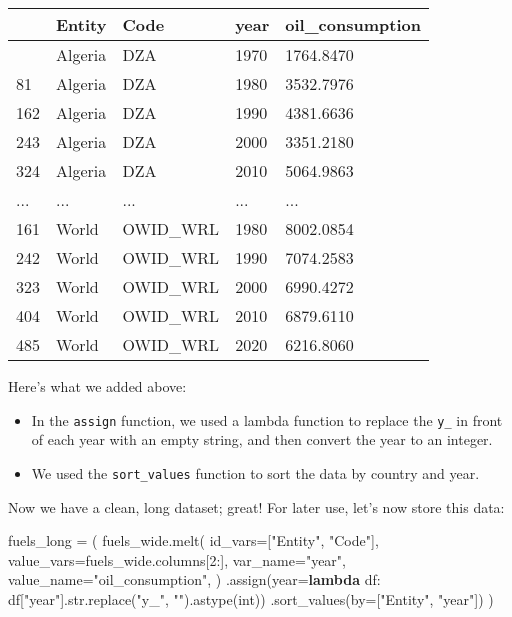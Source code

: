 \documentclass[
  letterpaper,
  DIV=11,
  numbers=noendperiod]{scrreprt}
\newenvironment{Shaded}{\begin{snugshade}}{\end{snugshade}}
\newcommand{\BuiltInTok}[1]{\textcolor[rgb]{0.00,0.23,0.31}{#1}}
\newcommand{\DecValTok}[1]{\textcolor[rgb]{0.68,0.00,0.00}{#1}}
\newcommand{\KeywordTok}[1]{\textcolor[rgb]{0.00,0.23,0.31}{\textbf{#1}}}
\newcommand{\NormalTok}[1]{\textcolor[rgb]{0.00,0.23,0.31}{#1}}
\newcommand{\OperatorTok}[1]{\textcolor[rgb]{0.37,0.37,0.37}{#1}}
\newcommand{\StringTok}[1]{\textcolor[rgb]{0.13,0.47,0.30}{#1}}
\providecommand{\tightlist}{%
  \setlength{\itemsep}{0pt}\setlength{\parskip}{0pt}}\usepackage{longtable,booktabs,array}
\begin{document}
\begin{longtable}[]{@{}lllll@{}}
\toprule\noalign{}
& Entity & Code & year & oil\_consumption \\
\midrule\noalign{}
\endhead
\bottomrule\noalign{}
\endlastfoot
0 & Algeria & DZA & 1970 & 1764.8470 \\
81 & Algeria & DZA & 1980 & 3532.7976 \\
162 & Algeria & DZA & 1990 & 4381.6636 \\
243 & Algeria & DZA & 2000 & 3351.2180 \\
324 & Algeria & DZA & 2010 & 5064.9863 \\
... & ... & ... & ... & ... \\
161 & World & OWID\_WRL & 1980 & 8002.0854 \\
242 & World & OWID\_WRL & 1990 & 7074.2583 \\
323 & World & OWID\_WRL & 2000 & 6990.4272 \\
404 & World & OWID\_WRL & 2010 & 6879.6110 \\
485 & World & OWID\_WRL & 2020 & 6216.8060 \\
\end{longtable}

Here's what we added above:

\begin{itemize}
\tightlist
\item
  In the \texttt{assign} function, we used a lambda function to replace
  the \texttt{y\_} in front of each year with an empty string, and then
  convert the year to an integer.
\item
  We used the \texttt{sort\_values} function to sort the data by country
  and year.
\end{itemize}

Now we have a clean, long dataset; great! For later use, let's now store
this data:

\begin{Shaded}
\begin{Highlighting}[]
\NormalTok{fuels\_long }\OperatorTok{=}\NormalTok{ (}
\NormalTok{    fuels\_wide.melt(}
\NormalTok{        id\_vars}\OperatorTok{=}\NormalTok{[}\StringTok{"Entity"}\NormalTok{, }\StringTok{"Code"}\NormalTok{],}
\NormalTok{        value\_vars}\OperatorTok{=}\NormalTok{fuels\_wide.columns[}\DecValTok{2}\NormalTok{:],}
\NormalTok{        var\_name}\OperatorTok{=}\StringTok{"year"}\NormalTok{,}
\NormalTok{        value\_name}\OperatorTok{=}\StringTok{"oil\_consumption"}\NormalTok{,}
\NormalTok{    )}
\NormalTok{    .assign(year}\OperatorTok{=}\KeywordTok{lambda}\NormalTok{ df: df[}\StringTok{"year"}\NormalTok{].}\BuiltInTok{str}\NormalTok{.replace(}\StringTok{"y\_"}\NormalTok{, }\StringTok{""}\NormalTok{).astype(}\BuiltInTok{int}\NormalTok{))}
\NormalTok{    .sort\_values(by}\OperatorTok{=}\NormalTok{[}\StringTok{"Entity"}\NormalTok{, }\StringTok{"year"}\NormalTok{])}
\NormalTok{)}
\end{Highlighting}
\end{Shaded}
\end{document}

